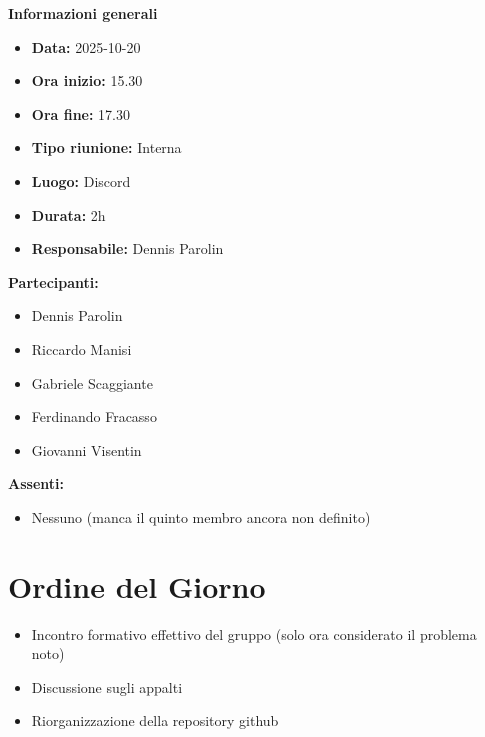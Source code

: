 \documentclass[a4paper,12pt]{article}
\begin{document}
\clearpage
{\large \textbf{Informazioni generali}}
{\footnotesize
{}

\begin{itemize}
    \item \textbf{Data:} 2025-10-20
    \item \textbf{Ora inizio:} 15.30
    \item \textbf{Ora fine:} 17.30
    \item \textbf{Tipo riunione:} Interna
    \item \textbf{Luogo:} Discord
    \item \textbf{Durata:} 2h
    \item \textbf{Responsabile:} Dennis Parolin
\end{itemize}

\vspace{0.2cm}

\textbf{Partecipanti:}
\begin{itemize}
    \item Dennis Parolin
    \item Riccardo Manisi
    \item Gabriele Scaggiante
    \item Ferdinando Fracasso
    \item Giovanni Visentin
\end{itemize}

\textbf{Assenti:}
\begin{itemize}
    \item Nessuno (manca il quinto membro ancora non definito)
\end{itemize}
}

\vspace{0.5cm}

\vspace{0.8cm}

\clearpage
\tableofcontents
\thispagestyle{empty} %
\clearpage

\section{Ordine del Giorno}
\begin{itemize}
    \item Incontro formativo effettivo del gruppo (solo ora considerato il problema noto)
    \item Discussione sugli appalti
    \item Riorganizzazione della repository github
\end{itemize}
\end{document}
